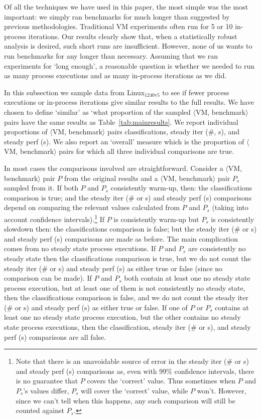 \documentclass[acmsmall,screen]{acmart}
\newcommand{\bencherseven}{Linux$_\mathrm{1240v5}$\xspace}
\newcommand{\vmbpair}{$\langle$VM, benchmark$\rangle$\xspace}
\begin{document}
Of all the techniques we have used in this paper, the most simple was the most
important: we simply ran benchmarks for much longer than suggested by previous methodologies.
Traditional VM experiments often run for 5 or 10 in-process iterations. Our results
clearly show that, when a statistically robust analysis is desired, such short
runs are insufficient. However, none of us wants to run benchmarks for any longer
than necessary. Assuming that we ran
experiments for `long enough', a reasonable question is whether we needed to run
as many process executions and as many in-process iterations as we did.

In this subsection we sample data from \bencherseven to see if fewer
process executions or in-process iterations give similar results to the full
results. We have chosen to define `similar' as `what proportion of the sampled
\vmbpair pairs have the same results as Table~\ref{tab:mainresults}. We report
individual proportions of \vmbpair pairs classifications, steady iter (\#,
s), and
steady perf (s). We also report an `overall' measure which is the proportion of
\vmbpair pairs for which all three individual comparisons are true.

In most cases the comparisons involved are straightforward. Consider
a \vmbpair pair $P$ from the original results and a \vmbpair pair $P_s$
sampled from it. If both $P$ and $P_s$ consistently warm-up,
then: the classifications comparison is true;
and the steady iter (\# or s) and steady perf (s) comparisons depend on comparing the
relevant values calculated from $P$ and $P_s$ (taking into
account confidence intervals).\footnote{Note that there is an unavoidable
source of error in the steady iter (\# or s) and steady perf (s) comparisons as,
even with 99\% confidence intervals, there is no guarantee that $P$
covers the `correct' value. Thus sometimes when $P$ and $P_s$'s values
differ, $P_s$ will cover the `correct' value, while $P$ won't. However, since
we can't tell when this happens, any such comparison will still be counted against $P_s$.}
If $P$ is consistently warm-up but $P_s$ is consistently slowdown then:
the classifications comparison is false; but
the steady iter (\# or s) and steady perf (s) comparisons are made as
before. The main complication comes from no steady state process executions. If
$P$ and $P_s$ are consistently no steady state then the
classifications comparison is true, but we do not count the steady iter (\# or s) and
steady perf (s) as either true or false (since no comparison can be made).
If $P$ and $P_s$ both contain at least one no steady state process execution,
but at least one of them is not consistently no steady state, then
the classifications comparison is false, and we do not count the steady iter (\# or s) and
steady perf (s) as either true or false. If one of $P$ or $P_s$ contains
at least one no steady state process execution, but the other contains
no steady state process executions, then the classification, steady
iter (\# or s), and steady perf (s) comparisons are all false.
\end{document}
